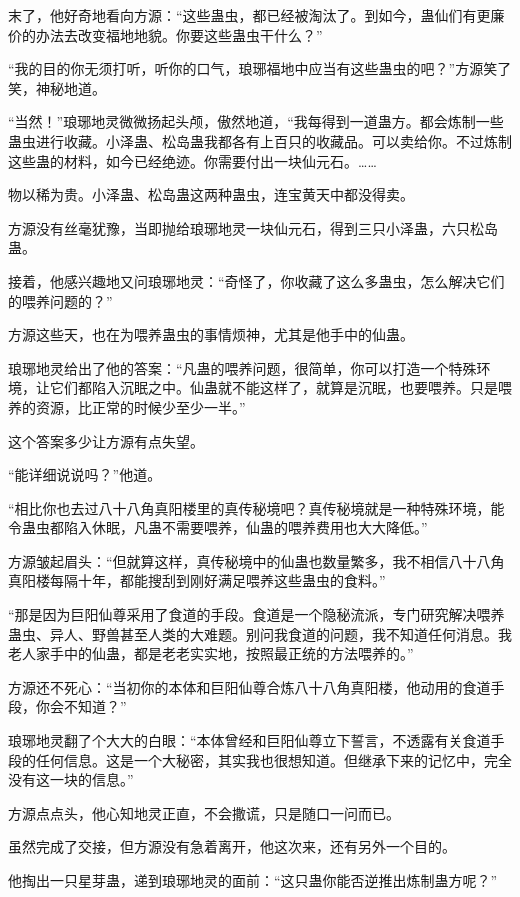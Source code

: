 \begin{this_body}
末了，他好奇地看向方源：“这些蛊虫，都已经被淘汰了。到如今，蛊仙们有更廉价的办法去改变福地地貌。你要这些蛊虫干什么？”

“我的目的你无须打听，听你的口气，琅琊福地中应当有这些蛊虫的吧？”方源笑了笑，神秘地道。

“当然！”琅琊地灵微微扬起头颅，傲然地道，“我每得到一道蛊方。都会炼制一些蛊虫进行收藏。小泽蛊、松岛蛊我都各有上百只的收藏品。可以卖给你。不过炼制这些蛊的材料，如今已经绝迹。你需要付出一块仙元石。……

物以稀为贵。小泽蛊、松岛蛊这两种蛊虫，连宝黄天中都没得卖。

方源没有丝毫犹豫，当即抛给琅琊地灵一块仙元石，得到三只小泽蛊，六只松岛蛊。

接着，他感兴趣地又问琅琊地灵：“奇怪了，你收藏了这么多蛊虫，怎么解决它们的喂养问题的？”

方源这些天，也在为喂养蛊虫的事情烦神，尤其是他手中的仙蛊。

琅琊地灵给出了他的答案：“凡蛊的喂养问题，很简单，你可以打造一个特殊环境，让它们都陷入沉眠之中。仙蛊就不能这样了，就算是沉眠，也要喂养。只是喂养的资源，比正常的时候少至少一半。”

这个答案多少让方源有点失望。

“能详细说说吗？”他道。

“相比你也去过八十八角真阳楼里的真传秘境吧？真传秘境就是一种特殊环境，能令蛊虫都陷入休眠，凡蛊不需要喂养，仙蛊的喂养费用也大大降低。”

方源皱起眉头：“但就算这样，真传秘境中的仙蛊也数量繁多，我不相信八十八角真阳楼每隔十年，都能搜刮到刚好满足喂养这些蛊虫的食料。”

“那是因为巨阳仙尊采用了食道的手段。食道是一个隐秘流派，专门研究解决喂养蛊虫、异人、野兽甚至人类的大难题。别问我食道的问题，我不知道任何消息。我老人家手中的仙蛊，都是老老实实地，按照最正统的方法喂养的。”

方源还不死心：“当初你的本体和巨阳仙尊合炼八十八角真阳楼，他动用的食道手段，你会不知道？”

琅琊地灵翻了个大大的白眼：“本体曾经和巨阳仙尊立下誓言，不透露有关食道手段的任何信息。这是一个大秘密，其实我也很想知道。但继承下来的记忆中，完全没有这一块的信息。”

方源点点头，他心知地灵正直，不会撒谎，只是随口一问而已。

虽然完成了交接，但方源没有急着离开，他这次来，还有另外一个目的。

他掏出一只星芽蛊，递到琅琊地灵的面前：“这只蛊你能否逆推出炼制蛊方呢？”


\end{this_body}
